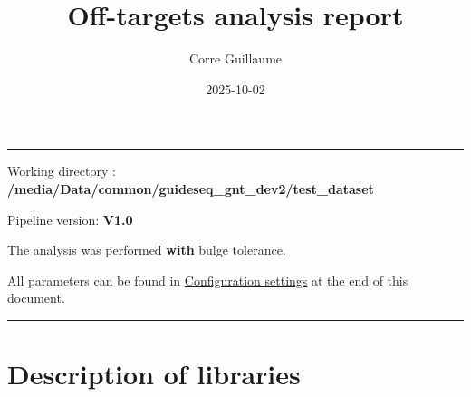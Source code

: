 \documentclass[
]{article}
\title{Off-targets analysis report}
\author{Corre Guillaume}
\date{2025-10-02}
\begin{document}
\maketitle

{
\setcounter{tocdepth}{2}
\tableofcontents
}
\begin{center}\rule{0.5\linewidth}{0.5pt}\end{center}

Working directory :
\textbf{/media/Data/common/guideseq\_gnt\_dev2/test\_dataset}

Pipeline version: \textbf{V1.0}

The analysis was performed \textbf{with} bulge tolerance.

All parameters can be found in
\hyperref[configuration-settings]{Configuration settings} at the end of
this document.

\begin{center}\rule{0.5\linewidth}{0.5pt}\end{center}

\section{Description of libraries}\label{description-of-libraries}

\begin{table}[H]
\centering\centering
\caption{\label{tab:unnamed-chunk-2}Table 1}
\centering
{}
\end{table}
\end{document}

